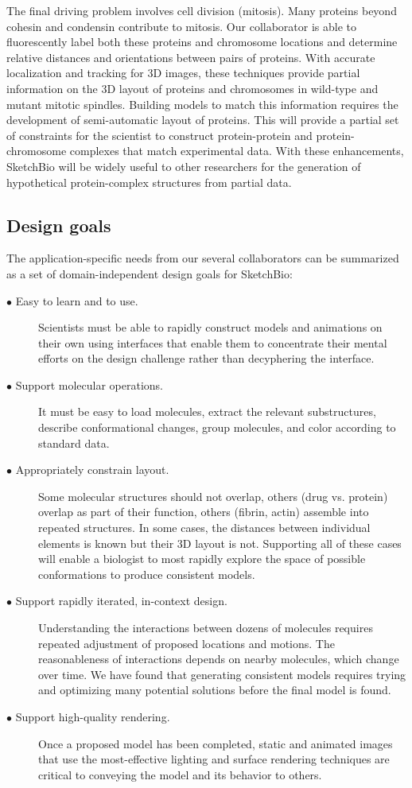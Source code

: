 \documentclass[twocolumn]{bmcart}%
\begin{document}
The final driving problem involves cell division (mitosis).
Many proteins beyond cohesin and condensin contribute to mitosis.  Our collaborator is able to fluorescently label both these proteins and chromosome locations and determine relative distances and orientations between pairs of proteins.
With accurate localization and tracking for 3D images, these techniques provide partial information on the 3D layout of proteins and chromosomes in wild-type and mutant mitotic spindles.
Building models to match this information requires the development of semi-automatic layout of proteins.
This will provide a partial set of constraints for the scientist to construct protein-protein and protein-chromosome complexes that match experimental data.
With these enhancements, SketchBio will be widely useful to other researchers for the generation of hypothetical protein-complex structures from partial data.

\subsection*{Design goals}
The application-specific needs from our several collaborators can be summarized as a set of domain-independent design goals for SketchBio:
\begin{description}
  \item[$\bullet$ Easy to learn and to use.] Scientists must be able to rapidly construct models and animations on their own using interfaces that enable them to concentrate their mental efforts on the design challenge rather than decyphering the interface.
  \item[$\bullet$ Support molecular operations.] It must be easy to load molecules, extract the relevant substructures, describe conformational changes, group molecules, and color according to standard data.
  \item[$\bullet$ Appropriately constrain layout.] Some molecular structures should not overlap, others (drug vs. protein) overlap as part of their function, others (fibrin, actin) assemble into repeated structures.  In some cases, the distances between individual elements is known but their 3D layout is not.  Supporting all of these cases will enable a biologist to most rapidly explore the space of possible conformations to produce consistent models.
  \item[$\bullet$ Support rapidly iterated, in-context design.] Understanding the interactions between dozens of molecules requires repeated adjustment of proposed locations and motions.  The reasonableness of interactions depends on nearby molecules, which change over time.  We have found that generating consistent models requires trying and optimizing many potential solutions before the final model is found.
  \item[$\bullet$ Support high-quality rendering.] Once a proposed model has been completed, static and animated images that use the most-effective lighting and surface rendering techniques are critical to conveying the model and its behavior to others.
\end{description}
\end{document}
